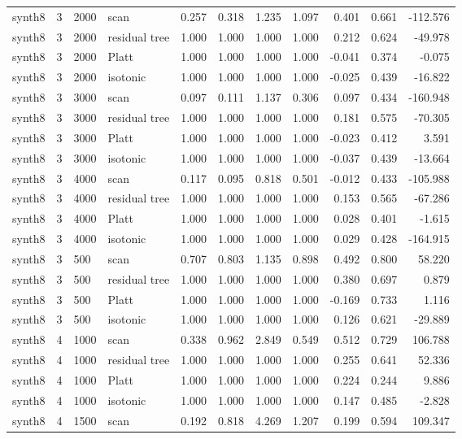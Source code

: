\begin{tabular}{lrllrrrrrrr}
synth8 & 3 & 2000 & scan & 0.257 & 0.318 & 1.235 & 1.097 & 0.401 & 0.661 & -112.576 \\
synth8 & 3 & 2000 & residual tree & 1.000 & 1.000 & 1.000 & 1.000 & 0.212 & 0.624 & -49.978 \\
synth8 & 3 & 2000 & Platt & 1.000 & 1.000 & 1.000 & 1.000 & -0.041 & 0.374 & -0.075 \\
synth8 & 3 & 2000 & isotonic & 1.000 & 1.000 & 1.000 & 1.000 & -0.025 & 0.439 & -16.822 \\
synth8 & 3 & 3000 & scan & 0.097 & 0.111 & 1.137 & 0.306 & 0.097 & 0.434 & -160.948 \\
synth8 & 3 & 3000 & residual tree & 1.000 & 1.000 & 1.000 & 1.000 & 0.181 & 0.575 & -70.305 \\
synth8 & 3 & 3000 & Platt & 1.000 & 1.000 & 1.000 & 1.000 & -0.023 & 0.412 & 3.591 \\
synth8 & 3 & 3000 & isotonic & 1.000 & 1.000 & 1.000 & 1.000 & -0.037 & 0.439 & -13.664 \\
synth8 & 3 & 4000 & scan & 0.117 & 0.095 & 0.818 & 0.501 & -0.012 & 0.433 & -105.988 \\
synth8 & 3 & 4000 & residual tree & 1.000 & 1.000 & 1.000 & 1.000 & 0.153 & 0.565 & -67.286 \\
synth8 & 3 & 4000 & Platt & 1.000 & 1.000 & 1.000 & 1.000 & 0.028 & 0.401 & -1.615 \\
synth8 & 3 & 4000 & isotonic & 1.000 & 1.000 & 1.000 & 1.000 & 0.029 & 0.428 & -164.915 \\
synth8 & 3 & 500 & scan & 0.707 & 0.803 & 1.135 & 0.898 & 0.492 & 0.800 & 58.220 \\
synth8 & 3 & 500 & residual tree & 1.000 & 1.000 & 1.000 & 1.000 & 0.380 & 0.697 & 0.879 \\
synth8 & 3 & 500 & Platt & 1.000 & 1.000 & 1.000 & 1.000 & -0.169 & 0.733 & 1.116 \\
synth8 & 3 & 500 & isotonic & 1.000 & 1.000 & 1.000 & 1.000 & 0.126 & 0.621 & -29.889 \\
synth8 & 4 & 1000 & scan & 0.338 & 0.962 & 2.849 & 0.549 & 0.512 & 0.729 & 106.788 \\
synth8 & 4 & 1000 & residual tree & 1.000 & 1.000 & 1.000 & 1.000 & 0.255 & 0.641 & 52.336 \\
synth8 & 4 & 1000 & Platt & 1.000 & 1.000 & 1.000 & 1.000 & 0.224 & 0.244 & 9.886 \\
synth8 & 4 & 1000 & isotonic & 1.000 & 1.000 & 1.000 & 1.000 & 0.147 & 0.485 & -2.828 \\
synth8 & 4 & 1500 & scan & 0.192 & 0.818 & 4.269 & 1.207 & 0.199 & 0.594 & 109.347 \\

\end{tabular}
